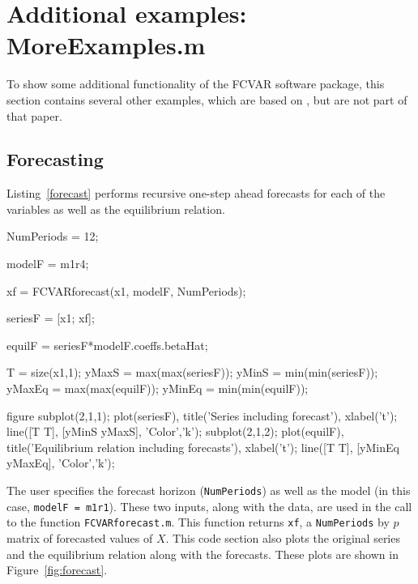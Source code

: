 \documentclass[article]{jss}
\begin{document}
\section{Additional examples: MoreExamples.m}
\label{sec:examples}

To show some additional functionality of the FCVAR software package, this section contains several other examples, which are based on \cite{JNP2014}, but are not part of that paper.

\subsection{Forecasting}
\label{sec:forecasting}

Listing~\ref{forecast} performs recursive one-step ahead forecasts for each of the variables as well as the equilibrium relation. 

\begin{Code}

NumPeriods = 12; %

modelF = m1r4;

xf = FCVARforecast(x1, modelF, NumPeriods);

seriesF = [x1; xf]; 

equilF = seriesF*modelF.coeffs.betaHat; 

T = size(x1,1);
yMaxS  = max(max(seriesF));
yMinS  = min(min(seriesF));
yMaxEq = max(max(equilF));
yMinEq = min(min(equilF));

figure
subplot(2,1,1);
plot(seriesF), 
title('Series including forecast'), xlabel('t');
line([T T], [yMinS yMaxS], 'Color','k');
subplot(2,1,2);
plot(equilF), 
title('Equilibrium relation including forecasts'), xlabel('t');
line([T T], [yMinEq yMaxEq], 'Color','k');
\end{Code}

The user specifies the forecast horizon (\verb|NumPeriods|) as well as the model (in this case, \verb|modelF = m1r1|). These two inputs, along with the data, are used in the call to the function \verb|FCVARforecast.m|. This function returns \verb|xf|, a \verb|NumPeriods| by $p$ matrix of forecasted values of $X$. This code section also plots the original series and the equilibrium relation along with the forecasts. These plots are shown in Figure~\ref{fig:forecast}.
\end{document}
